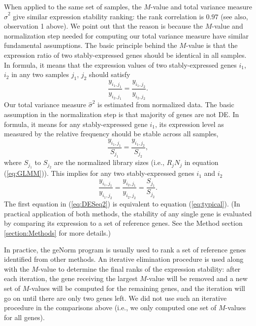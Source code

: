 \documentclass[11pt, a4paper]{article}
\begin{document}
When applied to the same set of samples, the $M$-value and total variance
measure $\hat\sigma^2$ give similar expression stability ranking: the rank
correlation is $0.97$ (see also, observation 1 above).
We point out that the reason is because the $M$-value and normalization step
needed for computing our total variance measure have similar fundamental
assumptions. 
The basic principle
behind the $M$-value is that the expression ratio of two stably-expressed
genes should be identical in all samples. In formula, it means that the
expression values of two stably-expressed genes $i_1$, $i_2$ in any two samples $j_1$, $j_2$
should satisfy
\begin{equation}\label{eq:typical}
   \dfrac{y_{i_1, j_1}}{y_{i_2, j_1}} = \dfrac{y_{i_1, j_2}}{y_{i_2, j_2}}.
\end{equation} 
Our total variance measure $\hat\sigma^2$ is estimated from normalized data.
The basic assumption in the normalization step is that majority of genes are
not DE. In formula, it means for any stably-expressed gene $i_1$, its expression
level as measured by the relative frequency should be stable across all
samples,
\begin{equation}\label{eq:DESeq} 
    \frac{y_{i_1, j_1}}{S_{j_1}}= \dfrac{y_{i_1, j_2}}{S_{j_2}},
\end{equation}
where $S_{j_1}$ to $S_{j_2}$ are the normalized library sizes (i.e., $R_j N_j$ in equation (\ref{eq:GLMM})).
This implies for any two stably-expressed genes $i_1$ and $i_2$
\begin{equation}\label{eq:DESeq2} 
    \frac{y_{i_1, j_1}}{y_{i_1, j_2}} = \frac{y_{i_2, j_1}}{y_{i_2, j_2}} =
    \frac{S_{j_1}}{S_{j_2}}.
\end{equation}
The first equation in (\ref{eq:DESeq2}) is equivalent to equation
(\ref{eq:typical}). (In practical application of both methods, the stability
of any single gene is evaluated by comparing its expression to a set of
reference genes. See the Method section \ref{section:Methods} for more details.)

In practice, the geNorm program \citep{vandesompele2002accurate} is usually
used to rank a set of reference genes identified from other methods.  An
iterative elimination procedure is used along with the $M$-value to determine
the final ranks of the expression stability:  after each iteration, the gene
receiving the largest $M$-value will be removed and a new set of $M$-values
will be computed for the remaining genes, and the iteration will go on until
there are only two genes left.  We did not use such an iterative procedure in
the comparisons above (i.e., we only computed one set of $M$-values for all
genes). 
\end{document}
